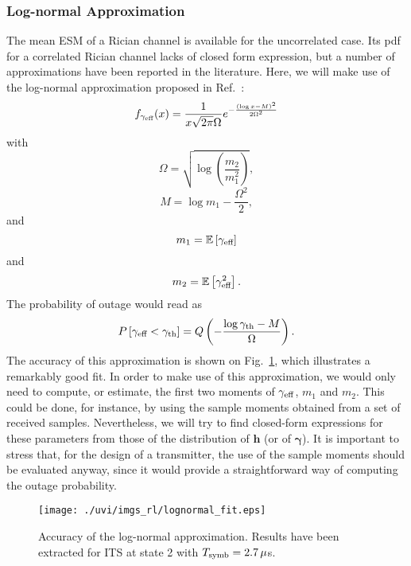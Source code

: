 \documentclass[journal,onecolumn,10pt,a4paper]{IEEEtran}
\def\h{{\mathbf h}}
\def\gammab{{\boldsymbol \gamma}}
\newcommand{\ex}{\mathbb{E}}
\begin{document}
\subsubsection{Log-normal Approximation}
\label{subsec:lognormal}
The mean ESM of a Rician channel is available for the uncorrelated case\cite{rico2012}. Its pdf for a correlated Rician channel lacks of closed form expression, but a number of approximations have been reported in the literature. Here, we will make use of the log-normal approximation proposed in Ref.~\cite{donthi2011}:
\begin{equation}\label{eq:lognormal_approximation}
f_{\gamma_{\textnormal{eff}}}(x) = \frac{1}{x\sqrt{2\pi}\Omega}e^{-\frac{(\log x-M)^2}{2\Omega^2}}
\end{equation}
with
\begin{equation}
	\Omega = \sqrt{\log\left(\frac{m_2}{m_1^2}\right)},
\end{equation}
\begin{equation}
	M = \log m_1-\frac{\Omega^2}{2},
\end{equation}
and
\begin{equation}\label{eq:m1}
	m_1 = \ex\left[\gamma_{\textnormal{eff}}\right]
\end{equation}
and
\begin{equation}\label{eq:m2}
	m_2 = \ex\left[\gamma_{\textnormal{eff}}^2\right].
\end{equation}
The probability of outage would read as
\begin{equation}
 P\left[\gamma_{\textnormal{eff}}<\gamma_{\textnormal{th}}\right] = Q\left(-\frac{\log \gamma_{\textnormal{th}}-M}{\Omega}\right).
\end{equation}
The accuracy of this approximation is shown on Fig.~\ref{fig:lognormal_approximation}, which illustrates a remarkably good fit. In order to make use of this approximation, we would only need to compute, or estimate, the first two moments of $\gamma_{\textnormal{eff}}$, $m_1$ and $m_2$. This could be done, for instance, by using the sample moments obtained from a set of received samples. Nevertheless, we will try to find closed-form expressions for these parameters from those of the distribution of $\h$ (or of $\gammab$). It is important to stress that, for the design of a transmitter, the use of the sample moments should be evaluated anyway, since it would provide a straightforward way of computing the outage probability.

\begin{figure}
 \centering
 \texttt{[image: ./uvi/imgs\_rl/lognormal\_fit.eps]}
\caption{Accuracy of the log-normal approximation. Results have been extracted for ITS at state 2 with $T_{\textnormal{symb}} = 2.7\,\mu$s.}
 \label{fig:lognormal_approximation}
\end{figure}
\end{document}

